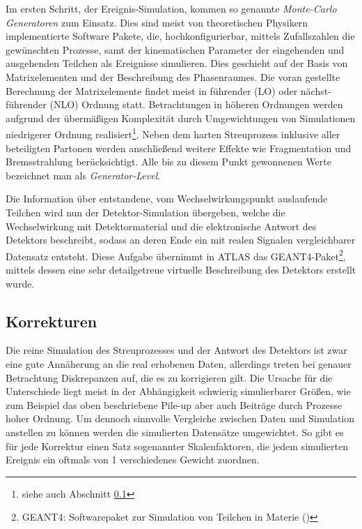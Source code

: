 Im ersten Schritt, der Ereignis-Simulation, kommen so genannte
\textit{Monte-Carlo Generatoren} zum Einsatz. Dies sind meist von theoretischen
Physikern implementierte Software Pakete, die, hochkonfigurierbar, mittels
Zufallszahlen die gewünschten Prozesse, samt der kinematischen Parameter der
eingehenden und ausgehenden Teilchen als Ereignisse simulieren. Dies geschieht
auf der Basis von Matrixelementen und der Beschreibung des Phasenraumes. Die
voran gestellte Berechnung der Matrixelemente findet meist in führender (LO)
oder nächst-führender (NLO) Ordnung statt. Betrachtungen in höheren Ordnungen
werden aufgrund der übermäßigen Komplexität durch Umgewichtungen von
Simulationen niedrigerer Ordnung realisiert\footnote{siehe auch Abschnitt
\ref{mc_corrections}}. Neben dem harten Streuprozess inklusive aller
beteiligten Partonen werden anschließend weitere Effekte wie Fragmentation und
Bremsstrahlung berücksichtigt. Alle bis zu diesem Punkt gewonnenen Werte
bezeichnet man als \textit{Generator-Level}.

Die Information über entstandene, vom Wechselwirkungspunkt auslaufende Teilchen
wird nun der Detektor-Simulation übergeben, welche die Wechselwirkung mit
Detektormaterial und die elektronische Antwort des Detektors beschreibt, sodass
an deren Ende ein mit realen Signalen vergleichbarer Datensatz entsteht. Diese
Aufgabe übernimmt in ATLAS das \textsc{GEANT4}-Paket\footnote{\textsc{GEANT4}:
Softwarepaket zur Simulation von Teilchen in Materie
(\cite{Agostinelli:2002hh})}, mittels dessen eine sehr detailgetreue virtuelle
Beschreibung des Detektors erstellt wurde.



\subsection{Korrekturen}
\label{mc_corrections}
Die reine Simulation des Streuprozesses und der Antwort des Detektors ist zwar
eine gute Annäherung an die real erhobenen Daten, allerdings treten bei genauer
Betrachtung Diskrepanzen auf, die es zu korrigieren gilt. Die Ursache für die
Unterschiede liegt meist in der Abhängigkeit schwierig simulierbarer Größen,
wie zum Beispiel das oben beschriebene Pile-up aber auch Beiträge durch 
Prozesse hoher Ordnung. Um dennoch sinnvolle Vergleiche zwischen Daten und
Simulation anstellen zu können werden die simulierten Datensätze umgewichtet.
So gibt es für jede Korrektur einen Satz sogenannter Skalenfaktoren, die jedem
simulierten Ereignis ein oftmals von 1 verschiedenes Gewicht zuordnen.

